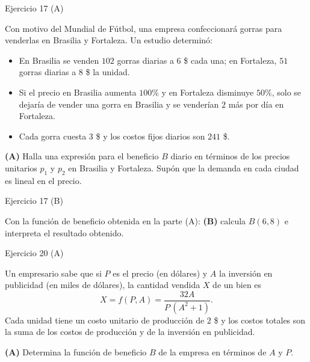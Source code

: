 \documentclass[aspectratio=169]{beamer}
\begin{document}
\begin{frame}{Ejercicio 17 (A)}
  \begin{mwejercicio}
    Con motivo del Mundial de Fútbol, una empresa confeccionará gorras para
    venderlas en Brasilia y Fortaleza. Un estudio determinó:
    \begin{itemize}
      \item En Brasilia se venden \(102\) gorras diarias a \(6\) \$ cada una;
            en Fortaleza, \(51\) gorras diarias a \(8\) \$ la unidad.
      \item Si el precio en Brasilia aumenta \(100\%\) y en Fortaleza disminuye
            \(50\%\), solo se dejaría de vender una gorra en Brasilia y se
            venderían \(2\) más por día en Fortaleza.
      \item Cada gorra cuesta \(3\) \$ y los costos fijos diarios son \(241\) \$.
    \end{itemize}
    \textbf{(A)} Halla una expresión para el beneficio \(B\) diario en términos
    de los precios unitarios \(p_1\) y \(p_2\) en Brasilia y Fortaleza.
    Supón que la demanda en cada ciudad es lineal en el precio.
  \end{mwejercicio}
\end{frame}

\begin{frame}{Ejercicio 17 (B)}
  \begin{mwejercicio}
    Con la función de beneficio obtenida en la parte (A):
    \textbf{(B)} calcula \(B(6,8)\) e interpreta el resultado obtenido.
  \end{mwejercicio}
\end{frame}

\begin{frame}{Ejercicio 20 (A)}
  \begin{mwejercicio}
    Un empresario sabe que si \(P\) es el precio (en dólares) y \(A\) la
    inversión en publicidad (en miles de dólares), la cantidad vendida \(X\) de
    un bien es
    \[
      X=f(P,A)=\frac{32A}{P\,(A^{2}+1)}.
    \]
    Cada unidad tiene un costo unitario de producción de \(2\) \$ y los costos
    totales son la suma de los costos de producción y de la inversión en
    publicidad.

    \textbf{(A)} Determina la función de beneficio \(B\) de la empresa en
    términos de \(A\) y \(P\).
  \end{mwejercicio}
\end{frame}
\end{document}
